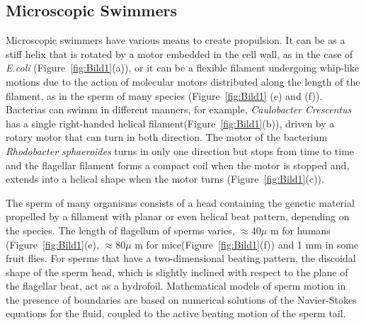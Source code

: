 \subsection{Microscopic Swimmers}
\label{sec:section 1}

Microscopic swimmers have various means to create propulsion. It can be as a stiff helix that is rotated by a motor embedded in the cell wall, as in the case of \textit{E.coli}
\cite{berg_bacteria_1973}(Figure~\ref{fig:Bild1}(a)), or it can be a flexible filament undergoing whip-like motions due to the action of molecular motors distributed along the
length of the filament, as in the sperm of many species\cite{blum_biophysics_1973} (Figure~\ref{fig:Bild1} (e) and (f)). Bacterias can swimm in different manners, for example, 
\textit{Caulobacter Crescentus}  has a single right-handed helical filament(Figure~\ref{fig:Bild1}(b)), driven by a rotary motor that can turn in both direction. The motor of the
bacterium \textit{Rhodobacter sphaeroides} turns in only one direction but stops from time to time and the flagellar filament forms a compact coil when the motor is stopped and, 
extends into a helical shape when the motor turns (Figure~\ref{fig:Bild1}(c)).\par

The sperm of many organisms consists of a head containing the genetic material propelled by a fillament with planar or even helical beat pattern, depending on the species. The 
length of flagellum of sperms varies, $\approx40\mu$ m for humans\cite{suarez_sperm_2006} (Figure~\ref{fig:Bild1}(e), $\approx80\mu$ m for mice(Figure~\ref{fig:Bild1}(f)) and
1 mm in some fruit flies\cite{joly_disentangling_1995}. For sperms that have a two-dimensional beating pattern\cite{elgeti_hydrodynamics_2010}, the discoidal shape of the sperm
head, which is slightly inclined with respect to the plane of the flagellar beat, act as a hydrofoil. 
Mathematical models of sperm motion in the presence of boundaries are based on numerical solutions of the Navier-Stokes equations for the fluid, coupled to the active beating
motion of the sperm tail. 



